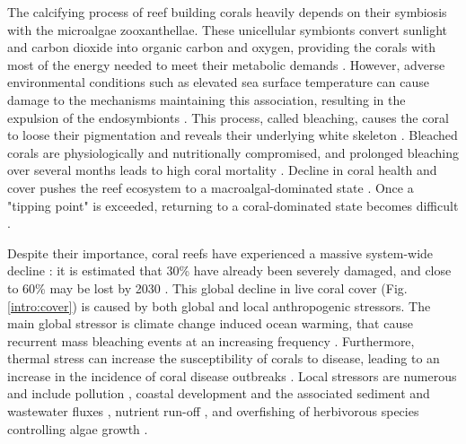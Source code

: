 The calcifying process of reef building corals heavily depends on their symbiosis with the microalgae zooxanthellae. These unicellular symbionts convert sunlight and carbon dioxide into organic carbon and oxygen, providing the corals with most of the energy needed to meet their metabolic demands \citep{muscatine1977reef}. However, adverse environmental conditions such as elevated sea surface temperature can cause damage to the mechanisms maintaining this association, resulting in the expulsion of the endosymbionts \citep{hoegh2007coral}. This process, called bleaching, causes the coral to loose their pigmentation and reveals their underlying white skeleton \citep{baker2008climate}. Bleached corals are physiologically and nutritionally compromised, and prolonged bleaching over several months leads to high coral mortality \citep{hughes2018spatial}. Decline in coral health and cover pushes the reef ecosystem to a macroalgal-dominated state \citep{hughes2003climate,mumby2007thresholds}. Once a "tipping point" is exceeded, returning to a coral-dominated state becomes difficult \citep{mumby2007thresholds,graham2015predicting}.

Despite their importance, coral reefs have experienced a massive system-wide decline \citep{hoegh2017coral}: it is estimated  that 30\% have already been severely damaged, and close to 60\% may be lost by 2030 \citep{hughes2003climate}. This global decline in live coral cover \citep{gardner2003long,pandolfi2003global,bruno2007regional} (Fig. \ref{intro:cover}) is caused by both global and local anthropogenic stressors. The main global stressor is climate change induced ocean warming, that cause recurrent mass bleaching events at an increasing frequency \citep{connell199730, hughes2018spatial}. Furthermore, thermal stress can increase the susceptibility of corals to disease, leading to an increase in the incidence of coral disease outbreaks \citep{harvell2002climate,bruno2007thermal,muller2012caribbean}. Local stressors are numerous and include pollution \citep{loya1980effects}, coastal development and the associated sediment and wastewater fluxes \citep{erftemeijer2012environmental, cunning2019extensive}, nutrient run-off \citep{hughes2003climate,sheppard2017biology}, and overfishing of herbivorous species controlling algae growth \citep{jackson2001historical}.

